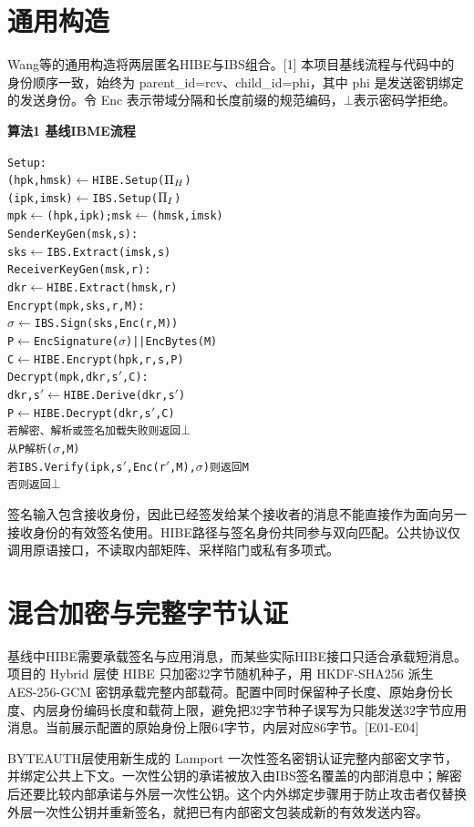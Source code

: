 \documentclass[UTF8,a4paper,12pt,oneside,openany,fontset=fandol]{ctexrep}
\begin{document}
\section{通用构造}
Wang等的通用构造将两层匿名HIBE与IBS组合。[1] 本项目基线流程与代码中的身份顺序一致，始终为 parent\_id=rcv、child\_id=phi，其中 phi 是发送密钥绑定的发送身份。令 Enc 表示带域分隔和长度前缀的规范编码，\ensuremath{\bot}表示密码学拒绝。

\noindent\textbf{算法1 基线IBME流程}
\begingroup
\small
\setlength{\parskip}{0pt}
\begin{alltt}
Setup:
  (hpk, hmsk) \ensuremath{\leftarrow} HIBE.Setup(\ensuremath{\Pi\sb{H}})
  (ipk, imsk) \ensuremath{\leftarrow} IBS.Setup(\ensuremath{\Pi\sb{I}})
  mpk \ensuremath{\leftarrow} (hpk, ipk); msk \ensuremath{\leftarrow} (hmsk, imsk)
SenderKeyGen(msk, s):
  sks \ensuremath{\leftarrow} IBS.Extract(imsk, s)
ReceiverKeyGen(msk, r):
  dkr \ensuremath{\leftarrow} HIBE.Extract(hmsk, r)
Encrypt(mpk, sks, r, M):
  \ensuremath{\sigma} \ensuremath{\leftarrow} IBS.Sign(sks, Enc(r, M))
  P \ensuremath{\leftarrow} EncSignature(\ensuremath{\sigma}) || EncBytes(M)
  C \ensuremath{\leftarrow} HIBE.Encrypt(hpk, r, s, P)
Decrypt(mpk, dkr, s\ensuremath{\prime}, C):
  dkr,s\ensuremath{\prime} \ensuremath{\leftarrow} HIBE.Derive(dkr, s\ensuremath{\prime})
  P \ensuremath{\leftarrow} HIBE.Decrypt(dkr,s\ensuremath{\prime}, C)
  若解密、解析或签名加载失败则返回 \ensuremath{\bot}
  从P解析(\ensuremath{\sigma}, M)
  若 IBS.Verify(ipk, s\ensuremath{\prime}, Enc(r\ensuremath{\prime}, M), \ensuremath{\sigma}) 则返回M
  否则返回 \ensuremath{\bot}
\end{alltt}
\endgroup
签名输入包含接收身份，因此已经签发给某个接收者的消息不能直接作为面向另一接收身份的有效签名使用。HIBE路径与签名身份共同参与双向匹配。公共协议仅调用原语接口，不读取内部矩阵、采样陷门或私有多项式。

\section{混合加密与完整字节认证}
基线中HIBE需要承载签名与应用消息，而某些实际HIBE接口只适合承载短消息。项目的 Hybrid 层使 HIBE 只加密32字节随机种子，用 HKDF-SHA256 派生 AES-256-GCM 密钥承载完整内部载荷。配置中同时保留种子长度、原始身份长度、内层身份编码长度和载荷上限，避免把32字节种子误写为只能发送32字节应用消息。当前展示配置的原始身份上限64字节，内层对应86字节。[E01-E04]

BYTEAUTH层使用新生成的 Lamport 一次性签名密钥认证完整内部密文字节，并绑定公共上下文。一次性公钥的承诺被放入由IBS签名覆盖的内部消息中；解密后还要比较内部承诺与外层一次性公钥。这个内外绑定步骤用于防止攻击者仅替换外层一次性公钥并重新签名，就把已有内部密文包装成新的有效发送内容。
\end{document}
